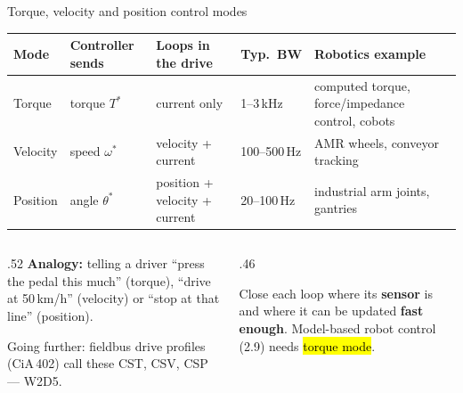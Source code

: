 \documentclass[aspectratio=169,10pt]{beamer}
\begin{document}
\begin{frame}{Torque, velocity and position control modes}
\small
\begin{tabularx}{\textwidth}{@{}l >{\raggedright\arraybackslash}X >{\raggedright\arraybackslash}X l >{\raggedright\arraybackslash}X@{}}
\toprule
\textbf{Mode} & \textbf{Controller sends} & \textbf{Loops in the drive} & \textbf{Typ.\ BW} & \textbf{Robotics example}\\
\midrule
Torque & torque $T^*$ & current only & 1--3\,kHz & computed torque, force/impedance control, cobots\\
Velocity & speed $\omega^*$ & velocity + current & 100--500\,Hz & AMR wheels, conveyor tracking\\
Position & angle $\theta^*$ & position + velocity + current & 20--100\,Hz & industrial arm joints, gantries\\
\bottomrule
\end{tabularx}
\vspace{3mm}
\begin{columns}[T]
\begin{column}{.52\textwidth}
\small
\textbf{Analogy:} telling a driver ``press the pedal this much'' (torque), ``drive at 50\,km/h'' (velocity) or ``stop at that line'' (position).
\vspace{1mm}

{\scriptsize\color{mkGray}Going further: fieldbus drive profiles (CiA\,402) call these CST, CSV, CSP --- W2D5.}
\end{column}
\begin{column}{.46\textwidth}
\begin{keybox}
Close each loop where its \textbf{sensor} is and where it can be updated \textbf{fast enough}. Model-based robot control (2.9) needs \hl{torque mode}.
\end{keybox}
\end{column}
\end{columns}
\end{frame}
\end{document}
